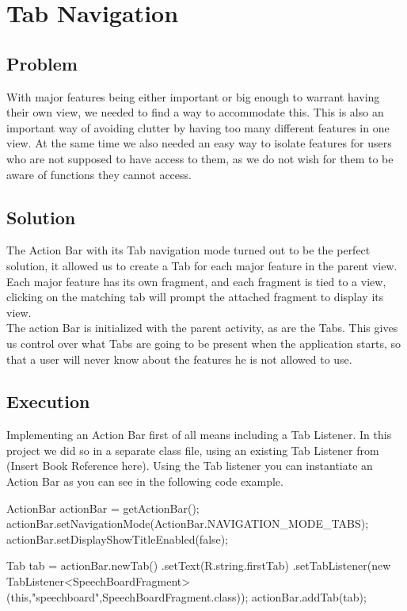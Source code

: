 \section{Tab Navigation} %
\subsection*{Problem}
With major features being either important or big enough to warrant having their own view, we needed to find a way to accommodate this.
This is also an important way of avoiding clutter by having too many different features in one view.
At the same time we also needed an easy way to isolate features for users who are not supposed to have access to them, as we do not wish for them to be aware of functions they cannot access.

\subsection*{Solution}
The Action Bar with its Tab navigation mode turned out to be the perfect solution, it allowed us to create a Tab for each major feature in the parent view.
Each major feature has its own fragment, and each fragment is tied to a view, clicking on the matching tab will prompt the attached fragment to display its view.\\
The action Bar is initialized with the parent activity, as are the Tabs.
This gives us control over what Tabs are going to be present when the application starts, so that a user will never know about the features he is not allowed to use.

\subsection*{Execution}
Implementing an Action Bar first of all means including a Tab Listener.
In this project we did so in a separate class file, using an existing Tab Listener from (Insert Book Reference here).
Using the Tab listener you can instantiate an Action Bar as you can see in the following code example.

\begin{source}{}
ActionBar actionBar = getActionBar();
actionBar.setNavigationMode(ActionBar.NAVIGATION_MODE_TABS); 
actionBar.setDisplayShowTitleEnabled(false);

Tab tab = actionBar.newTab()
		.setText(R.string.firstTab) 
		.setTabListener(new TabListener<SpeechBoardFragment>(this,"speechboard",SpeechBoardFragment.class));
actionBar.addTab(tab);
\end{source}

